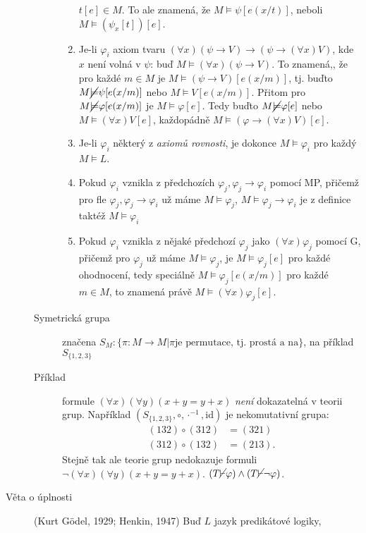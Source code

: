\documentclass[a4paper]{article}
\begin{document}
\begin{description}
\begin{description}
\begin{enumerate}
							$t[e] \in M$. To ale znamená, že $M \models \psi[e(x/t)]$,
							neboli $M \models (\psi_x[t])[e]$.
						\item Je-li $\varphi_i$ axiom tvaru
							$(\forall x)(\psi \to V) \to (\psi \to (\forall x)V)$,
							kde $x$ není volná v $\psi$: buď $M \models (\forall x)(\psi \to V)$.
							To znamená,, že pro každé $m \in M$ je
							$M \models (\psi \to V)[e(x/m)]$, tj. buďto
							$M \cancel{\models} \psi[e(x/m)]$ nebo $M \models V[e(x/m)]$.
							Přitom pro $M \cancel{\models} \varphi[e(x/m)]$ je $M \models \varphi[e]$.
							Tedy buďto  $M \cancel{\models} \varphi[e]$ nebo $M \models (\forall x)V[e]$,
							každopádně $M \models (\varphi \to (\forall x)V)[e]$.
						\item Je-li $\varphi_i$ některý z \textit{axiomů rovnosti}, je dokonce
							$M \models \varphi_i$ pro každý $M \models L$.
						\item Pokud $\varphi_i$ vznikla z předchozích $\varphi_j, \varphi_j \to \varphi_i$ pomocí
							MP, přičemž pro fle $\varphi_j, \varphi_j \to \varphi_i$ už máme $M \models \varphi_j$,
							$M \models \varphi_j \to \varphi_i$ je z definice taktéž $M \models \varphi_i$ 
						\item Pokud $\varphi_i$ vznikla z nějaké předchozí $\varphi_j$ jako $(\forall x)\varphi_j$ 
							pomocí G, přičemž pro $\varphi_j$ už máme $M \models \varphi_j$, je
							$M \models \varphi_j[e]$ pro každé ohodnocení, tedy speciálně
							$M \models \varphi_j[e(x/m)]$ pro každé $m \in M$, to znamená
							právě $M \models (\forall x) \varphi_j[e]$.
					\end{enumerate}
				\item[Symetrická grupa] značena $S_M : \{\pi : M \to M | \pi \text{
					je permutace, tj. prostá a na}\}$, na příklad $S_{\{1, 2, 3\}}$
				\item[Příklad] formule $(\forall x)(\forall y)(x + y = y + x)$ \textit{není} dokazatelná
					v teorii grup. Například $(S_{\{1, 2, 3\}}, \circ, \cdot^{-1}, \text{id})$
					je nekomutativní grupa: \begin{align*}
						(1 3 2) \circ (3 1 2) &= (3 2 1) \\
						(3 1 2) \circ (1 3 2) &= (2 1 3)
					.\end{align*}
					Stejně tak ale teorie grup nedokazuje formuli
					$\neg (\forall x)(\forall y)(x + y = y + x)$.
					$(T \cancel{\vdash} \varphi) \land (T \cancel{\vdash} \neg \varphi)$.
			\end{description}
		\item[Věta o úplnosti] (Kurt Gödel, 1929; Henkin, 1947) Buď $L$ jazyk predikátové logiky,

\end{description}
\end{document}
